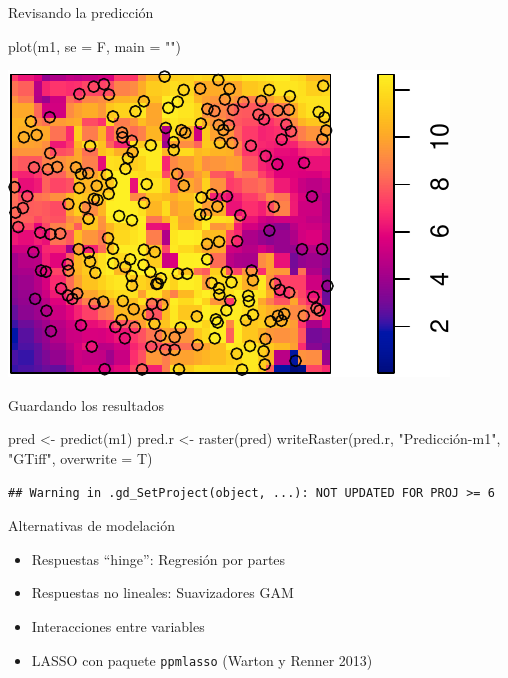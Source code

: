 \documentclass[
  11pt,
  ignorenonframetext,
]{beamer}
\newenvironment{Shaded}{}{}
\newcommand{\AttributeTok}[1]{\textcolor[rgb]{0.49,0.56,0.16}{#1}}
\newcommand{\FunctionTok}[1]{\textcolor[rgb]{0.02,0.16,0.49}{#1}}
\newcommand{\NormalTok}[1]{#1}
\newcommand{\OtherTok}[1]{\textcolor[rgb]{0.00,0.44,0.13}{#1}}
\newcommand{\StringTok}[1]{\textcolor[rgb]{0.25,0.44,0.63}{#1}}
\providecommand{\tightlist}{%
  \setlength{\itemsep}{0pt}\setlength{\parskip}{0pt}}
\begin{document}
\begin{frame}[fragile]{Revisando la predicción}
\protect\hypertarget{revisando-la-predicciuxf3n}{}
\begin{Shaded}
\begin{Highlighting}[]
\FunctionTok{plot}\NormalTok{(m1, }\AttributeTok{se =}\NormalTok{ F, }\AttributeTok{main =} \StringTok{""}\NormalTok{)}
\end{Highlighting}
\end{Shaded}

\begin{center}\includegraphics{Tutorial-spatstat-2_files/figure-beamer/unnamed-chunk-22-1} \end{center}
\end{frame}

\begin{frame}[fragile]{Guardando los resultados}
\protect\hypertarget{guardando-los-resultados}{}
\begin{Shaded}
\begin{Highlighting}[]
\NormalTok{pred }\OtherTok{\textless{}{-}} \FunctionTok{predict}\NormalTok{(m1)}
\NormalTok{pred.r }\OtherTok{\textless{}{-}} \FunctionTok{raster}\NormalTok{(pred)}
\FunctionTok{writeRaster}\NormalTok{(pred.r, }\StringTok{"Predicción{-}m1"}\NormalTok{, }\StringTok{"GTiff"}\NormalTok{,}
            \AttributeTok{overwrite =}\NormalTok{ T)}
\end{Highlighting}
\end{Shaded}

\begin{verbatim}
## Warning in .gd_SetProject(object, ...): NOT UPDATED FOR PROJ >= 6
\end{verbatim}
\end{frame}

\begin{frame}[fragile]{Alternativas de modelación}
\protect\hypertarget{alternativas-de-modelaciuxf3n}{}
\begin{itemize}
\tightlist
\item
  Respuestas ``hinge'': Regresión por partes
\item
  Respuestas no lineales: Suavizadores GAM
\item
  Interacciones entre variables
\item
  LASSO con paquete \texttt{ppmlasso} (Warton y Renner 2013)
\end{itemize}
\end{frame}
\end{document}
